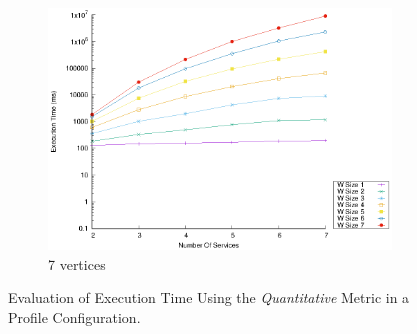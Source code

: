 \begin{figure}[!htb]
\begin{subfigure}{0.33\textwidth}
    \includegraphics[width=\textwidth]{Images/graphs/window_time_performance_n7_s7_50_89_n7}
    \caption{7 vertices}
    \label{fig:time_window_perce_wide_7n}
  \end{subfigure}
  \caption{Evaluation of Execution Time Using the \emph{Quantitative} Metric in a \average Profile Configuration.}  \label{fig:time_window_perce_wide}
\end{figure}
